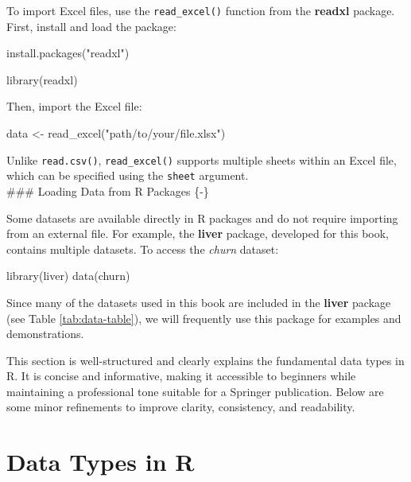 \documentclass[
  11pt,
]{book}
\makeatletter
\newenvironment{Shaded}{}{}
\newcommand{\FunctionTok}[1]{#1}
\newcommand{\NormalTok}[1]{#1}
\newcommand{\OtherTok}[1]{\textcolor[rgb]{0.39,0.39,0.39}{#1}}
\newcommand{\StringTok}[1]{\textcolor[rgb]{0.39,0.39,0.39}{#1}}
\newenvironment{kframe}{%
\medskip{}
\setlength{\fboxsep}{.8em}
 \def\at@end@of@kframe{}%
 \ifinner\ifhmode%
  \def\at@end@of@kframe{\end{minipage}}%
  \begin{minipage}{\columnwidth}%
 \fi\fi%
 \def\FrameCommand##1{\hskip\@totalleftmargin \hskip-\fboxsep
 \colorbox{shadecolor}{##1}\hskip-\fboxsep
     \hskip-\linewidth \hskip-\@totalleftmargin \hskip\columnwidth}%
 \MakeFramed {\advance\hsize-\width
   \@totalleftmargin\z@ \linewidth\hsize
   \@setminipage}}%
 {\par\unskip\endMakeFramed%
 \at@end@of@kframe}
\renewenvironment{Shaded}{\begin{kframe}}{\end{kframe}}
\theoremstyle{definition}
\theoremstyle{definition}
\theoremstyle{definition}
\theoremstyle{definition}
\theoremstyle{remark}
\makeatother
\begin{document}
To import Excel files, use the \texttt{read\_excel()} function from the \textbf{readxl} package. First, install and load the package:

\begin{Shaded}
\begin{Highlighting}[]
\FunctionTok{install.packages}\NormalTok{(}\StringTok{"readxl"}\NormalTok{)}

\FunctionTok{library}\NormalTok{(readxl)}
\end{Highlighting}
\end{Shaded}

Then, import the Excel file:

\begin{Shaded}
\begin{Highlighting}[]
\NormalTok{data }\OtherTok{\textless{}{-}} \FunctionTok{read\_excel}\NormalTok{(}\StringTok{"path/to/your/file.xlsx"}\NormalTok{)}
\end{Highlighting}
\end{Shaded}

Unlike \texttt{read.csv()}, \texttt{read\_excel()} supports multiple sheets within an Excel file, which can be specified using the \texttt{sheet} argument.\\
\#\#\# Loading Data from R Packages \{-\}

Some datasets are available directly in R packages and do not require importing from an external file. For example, the \textbf{liver} package, developed for this book, contains multiple datasets. To access the \emph{churn} dataset:

\begin{Shaded}
\begin{Highlighting}[]
\FunctionTok{library}\NormalTok{(liver)}
\FunctionTok{data}\NormalTok{(churn)}
\end{Highlighting}
\end{Shaded}

Since many of the datasets used in this book are included in the \textbf{liver} package (see Table \ref{tab:data-table}), we will frequently use this package for examples and demonstrations.

This section is well-structured and clearly explains the fundamental data types in R. It is concise and informative, making it accessible to beginners while maintaining a professional tone suitable for a Springer publication. Below are some minor refinements to improve clarity, consistency, and readability.

\section{Data Types in R}\label{data-types-in-r}
\end{document}
